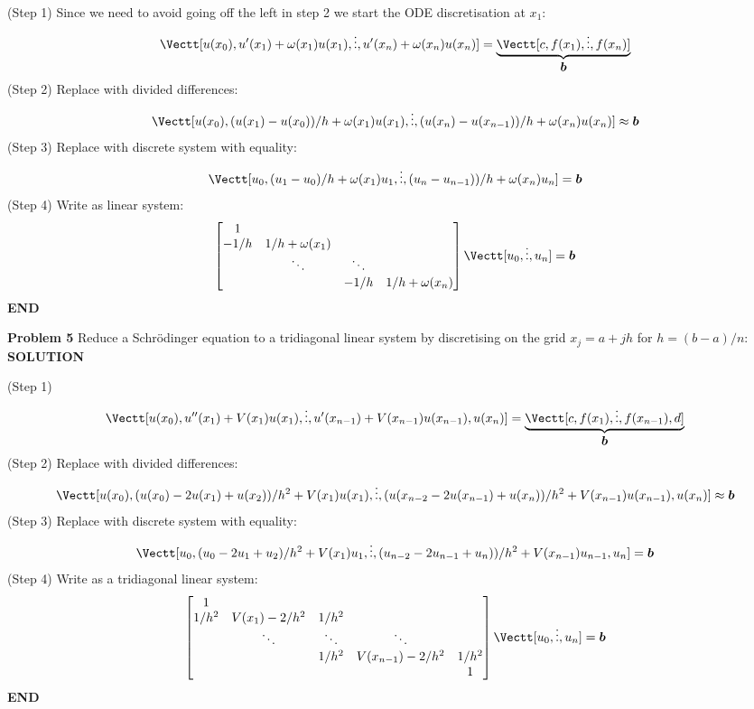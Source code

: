 \documentclass[12pt,a4paper]{article}
\def\b{ {\vc b} }
\begin{document}
(Step 1) Since we need to avoid going off the left in step 2 we start the ODE discretisation at $x_1$:
\[
\Vectt[u(x_0), u'(x_1) +  \ensuremath{\omega}(x_1)u(x_1), \ensuremath{\vdots}, u'(x_n) +  \ensuremath{\omega}(x_n)u(x_n)] = \underbrace{\Vectt[c, f(x_1),\ensuremath{\vdots},f(x_n)]}_{\ensuremath{\bm{\b}}}
\]
(Step 2) Replace with divided differences:
\[
\Vectt[u(x_0), (u(x_1)-u(x_0))/h +  \ensuremath{\omega}(x_1)u(x_1), \ensuremath{\vdots}, (u(x_n)-u(x_{n-1}))/h +  \ensuremath{\omega}(x_n)u(x_n)] \ensuremath{\approx} \ensuremath{\bm{\b}}
\]
(Step 3) Replace with discrete system with equality:
\[
\Vectt[u_0, (u_1-u_0)/h +  \ensuremath{\omega}(x_1)u_1, \ensuremath{\vdots}, (u_n-u_{n-1}))/h +  \ensuremath{\omega}(x_n)u_n] = \ensuremath{\bm{\b}}
\]
(Step 4) Write as linear system:
\[
\begin{bmatrix}
1 \\
-1/h & 1/h + \ensuremath{\omega}(x_1) \\
& \ensuremath{\ddots} & \ensuremath{\ddots} \\
&& -1/h & 1/h + \ensuremath{\omega}(x_n)
\end{bmatrix} \Vectt[u_0,\ensuremath{\vdots},u_n] = \ensuremath{\bm{\b}}
\]
\textbf{END}

\textbf{Problem 5} Reduce a Schrödinger equation to a tridiagonal linear system by discretising on the grid $x_j = a + j h$ for $h = (b-a)/n$:
\textbf{SOLUTION}

(Step 1) 
\[
\Vectt[u(x_0), u''(x_1) + V(x_1) u(x_1), \ensuremath{\vdots}, u'(x_{n-1}) + V(x_{n-1}) u(x_{n-1}), u(x_n)] = \underbrace{\Vectt[c, f(x_1),\ensuremath{\vdots},f(x_{n-1}), d]}_{\ensuremath{\bm{\b}}}
\]
(Step 2) Replace with divided differences:
\[
\Vectt[u(x_0), (u(x_0)-2u(x_1)+u(x_2))/h^2 + V(x_1)u(x_1), \ensuremath{\vdots}, (u(x_{n-2} - 2u(x_{n-1})+u(x_n))/h^2 + V(x_{n-1})u(x_{n-1}), u(x_n)] \ensuremath{\approx} \ensuremath{\bm{\b}}
\]
(Step 3) Replace with discrete system with equality:
\[
\Vectt[u_0, (u_0-2u_1+u_2)/h^2 + V(x_1)u_1, \ensuremath{\vdots}, (u_{n-2}-2u_{n-1}+u_n))/h^2+ V(x_{n-1})u_{n-1},u_n] = \ensuremath{\bm{\b}}
\]
(Step 4) Write as a tridiagonal linear system:
\[
\begin{bmatrix}
1 \\
1/h^2 & V(x_1)-2/h^2 & 1/h^2 \\
& \ensuremath{\ddots} & \ensuremath{\ddots} & \ensuremath{\ddots} \\
&&1/h^2 & V(x_{n-1})-2/h^2 & 1/h^2 \\
&& &&1
\end{bmatrix} \Vectt[u_0,\ensuremath{\vdots},u_n] = \ensuremath{\bm{\b}}
\]
\textbf{END}
\end{document}
